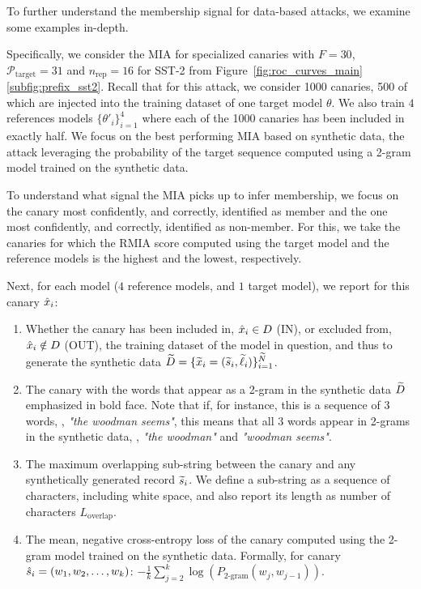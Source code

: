 
To further understand the membership signal for data-based attacks, we examine some examples in-depth. 

Specifically, we consider the MIA for specialized canaries with $F=30$, $\mathcal{P}_\textrm{target}=31$ and $n_\textrm{rep}=16$ for SST-2 from Figure~\ref{fig:roc_curves_main}\ref{subfig:prefix_sst2}. Recall that for this attack, we consider \num{1000} canaries, \num{500} of which are injected into the training dataset of one target model $\theta$. We also train $4$ references models $\{\theta'_i\}_{i=1}^4$ where each of the \num{1000} canaries has been included in exactly half. We focus on the best performing MIA based on synthetic data, \ie the attack leveraging the probability of the target sequence computed using a 2-gram model trained on the synthetic data. 

To understand what signal the MIA picks up to infer membership, we focus on the canary most confidently, and correctly, identified as member and the one most confidently, and correctly, identified as non-member. For this, we take the canaries for which the RMIA score computed using the target model and the reference models is the highest and the lowest, respectively. 

Next, for each model ($4$ reference models, and $1$ target model), we report for this canary ${\hat{x}}_i$: 

\begin{enumerate}
    \item Whether the canary has been included in, ${\hat{x}}_i \in D$ (IN), or excluded from, ${\hat{x}}_i \notin D$ (OUT), the training dataset of the model in question, and thus to generate the synthetic data ${\widetilde{D}} = \{ {\widetilde{x}}_i = ({\widetilde{s}}_i, {\widetilde{\ell}}_i) \}_{i=1}^{\widetilde{N}}$. 
%
    \item The canary with the words that appear as a 2-gram in the synthetic data ${\widetilde{D}}$ emphasized in bold face. Note that if, for instance, this is a sequence of $3$ words, \eg, \emph{"the woodman seems"}, this means that all 3 words appear in 2-grams in the synthetic data, \eg, \emph{"the woodman"} and \emph{"woodman seems"}.
%
    \item The maximum overlapping sub-string between the canary and any synthetically generated record ${\widetilde{s}}_i$. We define a sub-string as a sequence of characters, including white space, and also report its length as number of characters $L_{\text{overlap}}$.
% 
    \item The mean, negative cross-entropy loss of the canary computed using the 2-gram model trained on the synthetic data. Formally, for canary ${\hat{s}}_i = (w_1, w_2, \ldots, w_k)$: $-\frac{1}{k} \sum_{j=2}^{k} \log \left(P_{\text{2-gram}}(w_j, w_{j-1})\right)$.
\end{enumerate}

